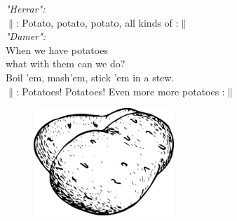\documentclass[a6paper,10pt]{article}
\begin{document}
\begin{center}
\end{center}
\begin{lyrics}
\textit{"Herrar":}
\vspace{3pt}\\
$\|$: Potato, potato, potato, all kinds of :$\|$
\vspace{5pt}\\
\textit{"Damer":}
\vspace{3pt}\\
When we have potatoes\\
what with them can we do?\\
Boil ’em, mash’em, stick ’em in a stew.
\vspace{5pt}\\
$\|$: Potatoes! Potatoes! Even more more potatoes  :$\|$
\end{lyrics}

\vspace{20pt}
\begin{figure}[h!]
\begin{center}
\includegraphics[width=150pt]{potatiskanon}
\end{center}
\end{figure}

\setlength{\oddsidemargin}{-0.47in}
\end{document}
